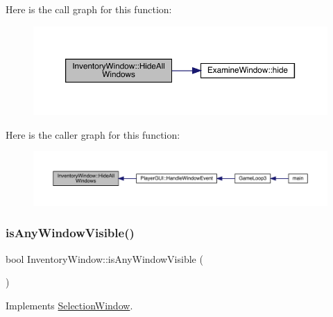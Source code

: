Here is the call graph for this function\+:
\nopagebreak
\begin{figure}[H]
\begin{center}
\leavevmode
\includegraphics[width=350pt]{d1/dee/class_inventory_window_aef14cbe5f17a626c01df9948aac71259_cgraph}
\end{center}
\end{figure}
Here is the caller graph for this function\+:
\nopagebreak
\begin{figure}[H]
\begin{center}
\leavevmode
\includegraphics[width=350pt]{d1/dee/class_inventory_window_aef14cbe5f17a626c01df9948aac71259_icgraph}
\end{center}
\end{figure}
\mbox{\label{class_inventory_window_a6fd4220caaec67979e93f5b8b52365a8}} 
\subsubsection{\texorpdfstring{is\+Any\+Window\+Visible()}{isAnyWindowVisible()}}
{\footnotesize\ttfamily bool Inventory\+Window\+::is\+Any\+Window\+Visible (\begin{DoxyParamCaption}{ }\end{DoxyParamCaption})\hspace{0.3cm}{\ttfamily [virtual]}}



Implements \mbox{\hyperlink{class_selection_window_ad68953313a12ca42cafea68e15077c86}{Selection\+Window}}.

